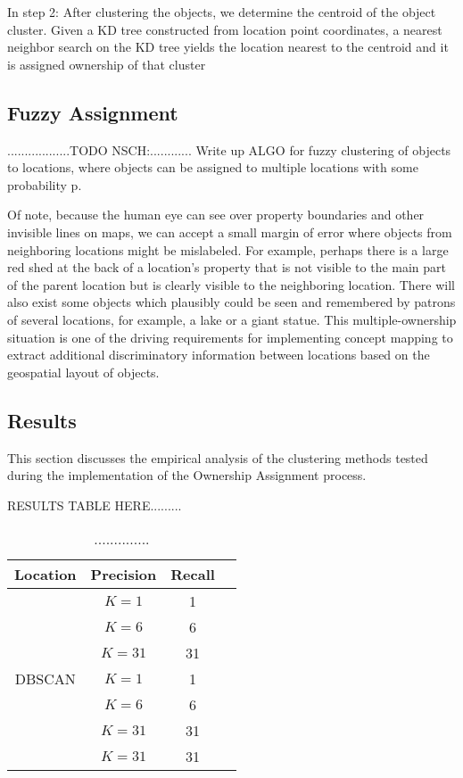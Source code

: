 In step 2: After clustering the objects, we determine the centroid of the object cluster. Given a KD tree constructed from location point coordinates, a nearest neighbor search on the KD tree yields the location nearest to the centroid and it is assigned ownership of that cluster



\subsection{Fuzzy Assignment}
..................TODO NSCH:............ Write up ALGO for fuzzy clustering of objects to locations, where objects can be assigned to multiple locations with some probability p.

Of note, because the human eye can see over property boundaries and other invisible lines on maps, we can accept a small margin of error where objects from neighboring locations might be mislabeled. For example, perhaps there is a large red shed at the back of a location's property that is not visible to the main part of the parent location but is clearly visible to the neighboring location.
There will also exist some objects which plausibly could be seen and remembered by patrons of several locations, for example, a lake or a giant statue. 
This multiple-ownership situation is one of the driving requirements for implementing concept mapping to extract additional discriminatory information between locations based on the geospatial layout of objects.


\subsection{Results}
This section discusses the empirical analysis of the clustering methods tested during the implementation of the Ownership Assignment process. 

RESULTS TABLE HERE.........
\begin{table}[h!]
	\begin{center}
		\begin{tabular}{ |c|c|c|c| } 
			\hline
			Location & Precision & Recall \\
			\hline
			\multirow{7}{4em}{DBSCAN} 
                & $K=1$ & 1 \\ 
			& $K=6$ & 6  \\ 
			& $K=31$ & 31 \\ 
                & $K=1$ & 1 \\ 
			& $K=6$ & 6  \\ 
			& $K=31$ & 31 \\ 
   			& $K=31$ & 31 \\ 
			\hline
		\end{tabular}
		\label{table:clustering}
		\caption{..............}
	\end{center}
\end{table}


